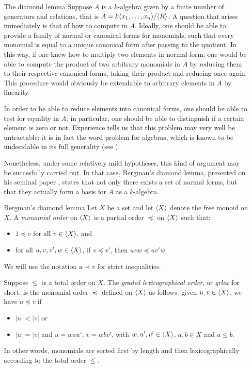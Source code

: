 \begin{chapter}{The diamond lemma}
Suppose $A$ is a $k$-algebra given by a finite number of generators and relations, that is $A=k\langle x_1,\dots,x_n\rangle/\langle R\rangle$. A question that arises immediately is that of how to compute in $A$. Ideally, one should be able to provide a family of normal or canonical forms for monomials, such that every monomial is equal to a unique canonical form after passing to the quotient. In this way, if one knew how to multiply two elements in normal form, one would be able to compute the product of two arbitrary monomials in $A$ by reducing them to their respective canonical forms, taking their product and reducing once again. This procedure would obviously be extendable to arbitrary elements in $A$ by linearity.

In order to be able to reduce elements into canonical forms, one should be able to test for equality in $A$; in particular, one should be able to distinguish if a certain element is zero or not. Experience tells us that this problem may very well be untractable: it is in fact the word problem for algebras, which is known to be undecidable in its full generality (see \cite{Sti82}).

Nonetheless, under some relatively mild hypotheses, this kind of argument may be succesfully carried out. In that case, Bergman's diamond lemma, presented on his seminal paper \cite{Ber78}, states that not only there exists a set of normal forms, but that they actually form a basis for $A$ as a $k$-algebra.

\begin{section}{Bergman's diamond lemma}
Let $X$ be a set and let $\langle X\rangle$ denote the free monoid on $X$. A \emph{monomial order} on $\langle X\rangle$ is a partial order $\preceq$ on $\langle X\rangle$ such that:
\begin{itemize}
\item $1\preceq v$ for all $v\in \langle X\rangle$, and
\item for all $u,v,v',w\in \langle X\rangle$, if $v\preceq v'$, then $uvw\preceq uv'w$.
\end{itemize}
We will use the notation $u\prec v$ for strict inequalities.
\begin{exmp} Suppose $\leq$ is a total order on $X$. The \emph{graded lexicographical order}, or \emph{grlex} for short, is the monomial order $\preceq$ defined on $\langle X\rangle$ as follows: given $u,v\in \langle X\rangle$, we have $u\preceq v$ if
\begin{itemize}
\item $|u| < |v|$ or
\item $|u| = |v|$ and $u=wau'$, $v=wbv'$, with $w,u',v'\in \langle X\rangle$, $a,b\in X$ and $a\leq b$.
\end{itemize}
In other words, monomials are sorted first by length and then lexicographically according to the total order $\leq$.
\end{exmp}


\end{section}
\end{chapter}
